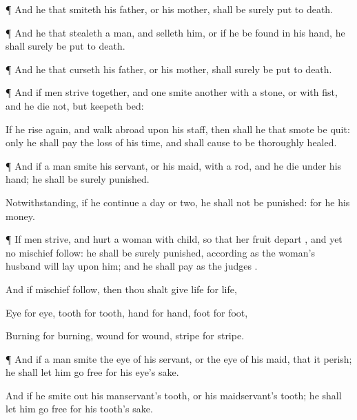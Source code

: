 {\par }{\PP {}¶ And he that
smiteth his
father, or his
mother, shall be
surely put to
death.


\par }{\PP {}¶ And he that
stealeth a
man, and
selleth him, or if he be
found in his
hand, he shall
surely be put to
death.


\par }{\PP {}¶ And he that
curseth his
father, or his
mother, shall
surely be put to
death.


\par }{\PP {}¶ And if
men
strive together, and
one
smite
another with a
stone,
or with
{}
fist, and he
die not, but
keepeth
{}
bed:

If he rise
again, and
walk
abroad upon his
staff, then shall he that
smote
{} be
quit: only he shall
pay
{} the loss of his
time, and shall cause
{} to be
thoroughly
healed.


\par }{\PP {}¶ And if a
man
smite his
servant, or his
maid, with a
rod, and he
die under his
hand; he shall be
surely
punished.

Notwithstanding, if he
continue a
day or
two, he shall not be
punished: for he
{} his
money.


\par }{\PP {}¶ If
men
strive, and
hurt a
woman with
child, so that her
fruit
depart
{}, and yet no mischief
follow: he shall be
surely
punished, according as the
woman’s
husband will
lay upon him; and he shall
pay as the
judges
{}.

And if
{} mischief
follow, then thou shalt
give
life for
life,

Eye for
eye,
tooth for
tooth,
hand for
hand,
foot for
foot,

Burning for
burning,
wound for
wound,
stripe for
stripe.


\par }{\PP {}¶ And if a
man
smite the
eye of his
servant, or the
eye of his
maid, that it
perish; he shall let him
go
free
for his
eye’s sake.

And if he
smite out his
manservant’s
tooth, or his
maidservant’s
tooth; he shall let him
go
free for his
tooth’s sake.


}
